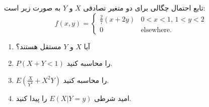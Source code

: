 \problem{}
تابع احتمال چگالی برای دو متغیر تصادفی $X$ و $Y$ به صورت زیر است:
\[
f(x, y) =
\begin{cases} 
\frac{2}{7} (x + 2y) & 0 < x < 1, \, 1 < y < 2 \\ 
0 & \text{elsewhere.}
\end{cases}
\]

\begin{enumerate}
    \item آیا $X$ و $Y$ مستقل هستند؟
    \item $P(X + Y < 1)$ را محاسبه کنید.
    \item $E(\frac{X}{Y^4} + X^2Y)$ را محاسبه کنید.
    \item امید شرطی $E(X|Y=y)$ را پیدا کنید.
\end{enumerate}
